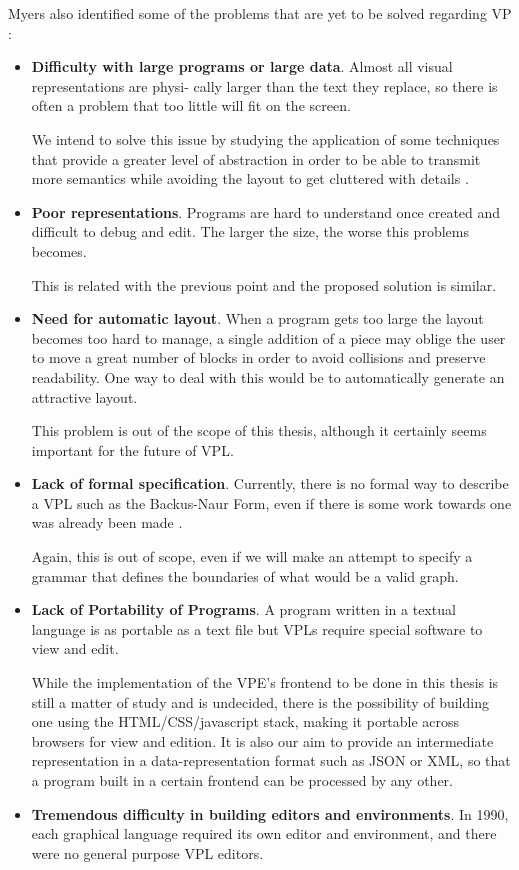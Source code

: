 Myers also identified some of the problems that are yet to be solved
regarding VP \cite{Myers1990}:

\begin{itemize}
  \item \textbf{Difficulty with large programs or large data}. Almost all visual representations are physi-
cally larger than the text they replace, so there is often a problem that too little will fit on
the screen.

We intend to solve this issue by studying the application of some techniques
that provide a greater level of abstraction in order to be able to transmit
more semantics while avoiding the layout to get cluttered with details \cite{Burnett1995}.
  \item \textbf{Poor representations}. Programs are hard to understand once created and
difficult to debug and edit. The larger the size, the worse this problems becomes.

This is related with the previous point and the proposed solution is similar.
  \item \textbf{Need for automatic layout}. When a program gets too large the layout
becomes too hard to manage, a single addition of a piece may oblige the user
to move a great number of blocks in order to avoid collisions and preserve
readability. One way to deal with this would be to automatically generate an
attractive layout.

This problem is out of the scope of this thesis, although
it certainly seems important for the future of VPL.
  \item \textbf{Lack of formal specification}. Currently, there is no formal way to describe
a VPL such as the Backus-Naur Form, even if there is some work towards one was
already been made \cite{selker1988elements}.

Again, this is out of scope, even
if we will make an attempt to specify a grammar that defines the boundaries of
what would be a valid graph.
  \item \textbf{Lack of Portability of Programs}. A program written in a textual language
is as portable as a text file but VPLs require special software to view and edit.

While the implementation of the VPE's frontend to be done in this thesis is still a matter
of study and is undecided, there is the possibility of building one using the
HTML/CSS/javascript stack, making it portable across browsers for view and edition.
It is also our aim to provide an intermediate representation in a data-representation
format such as JSON or XML, so that a program built in a certain frontend can
be processed by any other.
  \item \textbf{Tremendous difficulty in building editors and environments}.
In 1990, each graphical language required its own editor and environment, and there were no general purpose
VPL editors.


\end{itemize}
